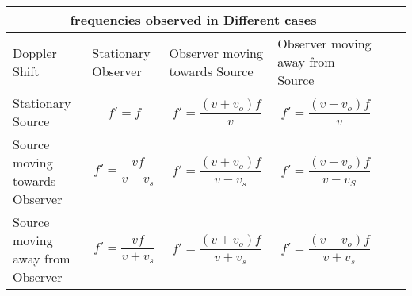 \setlength{\arrayrulewidth}{0.5mm}
\setlength{\tabcolsep}{18pt}
\renewcommand{\arraystretch}{1.5}


\begin{tabular}{ |p{2cm}|p{2cm}p{2cm}p{3cm}|p{}p{}}
    \hline
    \multicolumn{4}{|c|}{frequencies observed in Different cases} \\
    \hline
    Doppler Shift &Stationary Observer &Observer moving towards Source &Observer moving away from Source\\
    Stationary Source & $$f' = f$$& $$f' = \frac{(v+v_o) f}{v}$$&$$f' = \frac{(v-v_o) f}{v}$$\\
    Source moving towards Observer &$$f' = \frac{v f}{v-v_s }$$&$$f' = \frac{(v+v_o) f}{v- v_s }$$&$$f' = \frac{(v-v_o) f}{v- v_S }$$\\
    Source moving away from Observer&$$f' = \frac{v f}{v+ v_s }$$&$$f' = \frac{(v+v_o) f}{v+ v_s }$$&$$f' = \frac{(v-v_o) f}{v+ v_s }$$\\
    \hline
    \end{tabular}
